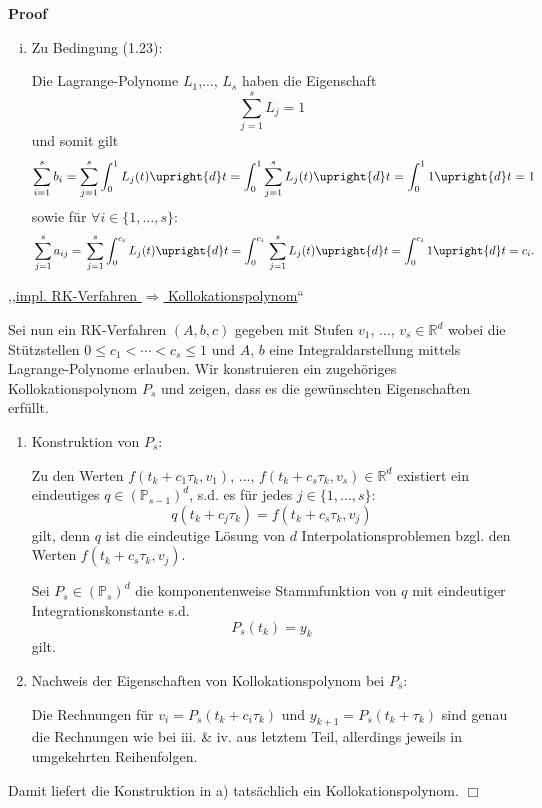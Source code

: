 \documentclass{book}
\newcommand{\textdots}{...}
\newenvironment{enumeratealpha}{\begin{enumerate}[a{\textup{)}}] }{\end{enumerate}}
\newenvironment{enumerateroman}{\begin{enumerate}[i.] }{\end{enumerate}}
\newenvironment{proof}{\noindent\textbf{Proof\ }}{\hspace*{\fill}$\Box$\medskip}
\begin{document}
\begin{proof}
\begin{enumerateroman}
    Damit sehen wir auch ,,woher die Formel f{\"u}r $b_j$ kommen sollte``.
    
    \item Zu Bedingung (1.23):
    
    Die Lagrange-Polynome $L_1$,..., $L_s$ haben die Eigenschaft
    \[ \sum_{j = 1}^s L_j = 1 \]
    und somit gilt
    \[ \sum_{i = 1}^s b_i = \sum_{j = 1}^s \int_0^1 L_j (t) \upright{d} t  =
       \int_0^1 \sum_{j = 1}^s L_j (t) \upright{d} t = \int_0^1 1 \upright{d}
       t = 1 \]
    sowie f{\"u}r $\text{} \forall i \in \{ 1, \ldots, s \}$:
    \[ \text{} \sum_{j = 1}^s a_{i j} = \text{} \sum_{j = 1}^s \int_0^{c_i}
       L_j (t) \upright{d} t = \int_0^{c_i} \text{} \sum_{j = 1}^s L_j (t)
       \upright{d} t = \int_0^{c_i} \text{} 1 \upright{d} t = c_i . \]
  \end{enumerateroman}
  {\hspace{4em}},,{\underline{impl. RK-Verfahren $\Rightarrow$
  Kollokationspolynom}}``
  
  Sei nun ein RK-Verfahren $(A, b, c)$ gegeben mit Stufen $v_1$, {\textdots},
  $v_s \in \mathbb{R}^d$ wobei die St{\"u}tzstellen $0 \leq c_1 < \cdots < c_s
  \leq 1$ und $A$, $b$ eine Integraldarstellung mittels Lagrange-Polynome
  erlauben. Wir konstruieren ein zugeh{\"o}riges Kollokationspolynom ${P_s} $
  und zeigen, dass es die gew{\"u}nschten Eigenschaften erf{\"u}llt.
  \begin{enumeratealpha}
    \item Konstruktion von $P_s$:
    
    Zu den Werten $f (t_k + c_1 \tau_k, v_1)$, {\textdots}, $f (t_k + c_s
    \tau_k, v_s) \in \mathbb{R}^d$ existiert ein eindeutiges $q \in
    (\mathbb{P}_{s - 1})^d$, s.d. es f{\"u}r jedes $j \in \{ 1, \ldots, s \}$:
    \[ q (t_k + c_j \tau_k) = f (t_k + c_s \tau_k, v_j) \]
    gilt, denn $q$ ist die eindeutige L{\"o}sung von $d$
    Interpolationsproblemen bzgl. den Werten $f (t_k + c_s \tau_k, v_j)$.
    
    Sei $P_s \in (\mathbb{P}_s)^d$ die komponentenweise Stammfunktion von $q$
    mit eindeutiger Integrationskonstante s.d.
    \[ P_s (t_k) = y_k \]
    gilt.
    
    \item Nachweis der Eigenschaften von Kollokationspolynom bei $P_s$:
    
    Die Rechnungen f{\"u}r $v_i = P_s (t_k + c_i \tau_k)$ und $y_{k + 1} =
    P_s (t_k + \tau_k)$ sind genau die Rechnungen wie bei iii. \& iv. aus
    letztem Teil, allerdings jeweils in umgekehrten Reihenfolgen.
  \end{enumeratealpha}
  {\hspace{1.7em}}Damit liefert die Konstruktion in a) tats{\"a}chlich ein
  Kollokationspolynom.
\end{proof}
\end{document}
